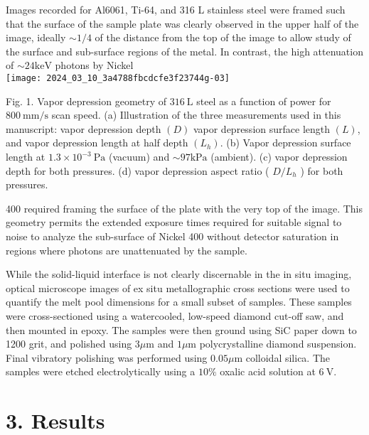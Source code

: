 \documentclass[10pt]{article}
\begin{document}
Images recorded for Al6061, Ti-64, and 316 L stainless steel were framed such that the surface of the sample plate was clearly observed in the upper half of the image, ideally $\sim 1 / 4$ of the distance from the top of the image to allow study of the surface and sub-surface regions of the metal. In contrast, the high attenuation of $\sim 24 \mathrm{keV}$ photons by Nickel\\
\texttt{[image: 2024\_03\_10\_3a4788fbcdcfe3f23744g-03]}

Fig. 1. Vapor depression geometry of $316 \mathrm{~L}$ steel as a function of power for $800 \mathrm{~mm} / \mathrm{s}$ scan speed. (a) Illustration of the three measurements used in this manuscript: vapor depression depth $(D)$ vapor depression surface length $(L)$, and vapor depression length at half depth $\left(L_{h}\right)$. (b) Vapor depression surface length at $1.3 \times 10^{-3} \mathrm{~Pa}$ (vacuum) and $\sim 97 \mathrm{kPa}$ (ambient). (c) vapor depression depth for both pressures. (d) vapor depression aspect ratio ( $D / L_{h}$ ) for both pressures.

400 required framing the surface of the plate with the very top of the image. This geometry permits the extended exposure times required for suitable signal to noise to analyze the sub-surface of Nickel 400 without detector saturation in regions where photons are unattenuated by the sample.

While the solid-liquid interface is not clearly discernable in the in situ imaging, optical microscope images of ex situ metallographic cross sections were used to quantify the melt pool dimensions for a small subset of samples. These samples were cross-sectioned using a watercooled, low-speed diamond cut-off saw, and then mounted in epoxy. The samples were then ground using SiC paper down to 1200 grit, and polished using $3 \mu \mathrm{m}$ and $1 \mu \mathrm{m}$ polycrystalline diamond suspension. Final vibratory polishing was performed using $0.05 \mu \mathrm{m}$ colloidal silica. The samples were etched electrolytically using a $10 \%$ oxalic acid solution at $6 \mathrm{~V}$.

\section*{3. Results}
\end{document}
